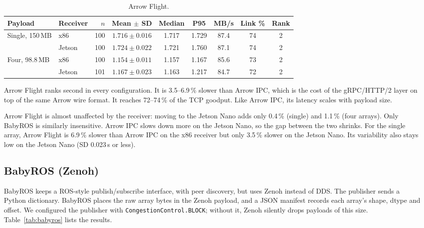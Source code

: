 \begin{table}[t]
  \centering
  \caption{Arrow Flight.}
  \label{tab:arrow-flight}
  \small
  \setlength{\tabcolsep}{4pt}
  \begin{tabular}{llrcccccc}
    \toprule
    Payload & Receiver & $n$ & Mean $\pm$ SD & Median & P95 & MB/s & Link \% & Rank \\
    \midrule
    Single, 150\,MB & x86    & 100 & $1.716 \pm 0.016$ & 1.717 & 1.729 & 87.4 & 74 & 2 \\
                    & Jetson & 100 & $1.724 \pm 0.022$ & 1.721 & 1.760 & 87.1 & 74 & 2 \\
    \addlinespace
    Four, 98.8\,MB  & x86    & 100 & $1.154 \pm 0.011$ & 1.157 & 1.167 & 85.6 & 73 & 2 \\
                    & Jetson & 101 & $1.167 \pm 0.023$ & 1.163 & 1.217 & 84.7 & 72 & 2 \\
    \bottomrule
  \end{tabular}
\end{table}

Arrow Flight ranks second in every configuration. It is 3.5--6.9\,\% slower than
Arrow IPC, which is the cost of the gRPC/HTTP/2 layer on top of the same Arrow wire
format. It reaches 72--74\,\% of the TCP goodput. Like Arrow IPC, its latency
scales with payload size.

Arrow Flight is almost unaffected by the receiver: moving to the Jetson Nano adds
only 0.4\,\% (single) and 1.1\,\% (four arrays). Only BabyROS is similarly
insensitive. Arrow IPC slows down more on
the Jetson Nano, so the gap between the two shrinks. For the single array, Arrow
Flight is 6.9\,\% slower than Arrow IPC on the x86 receiver but only 3.5\,\% slower on
the Jetson Nano. Its variability also stays low on the Jetson Nano (SD 0.023\,s or
less).

\subsection{BabyROS (Zenoh)}
\label{sec:res-babyros}

BabyROS keeps a ROS-style publish/subscribe interface, with peer discovery, but uses
Zenoh instead of DDS. The publisher sends a Python dictionary. BabyROS places the raw
array bytes in the Zenoh payload, and a JSON manifest records each array's shape,
dtype and offset. We configured the publisher with \texttt{CongestionControl.BLOCK};
without it, Zenoh silently drops payloads of this size. Table~\ref{tab:babyros} lists
the results.

